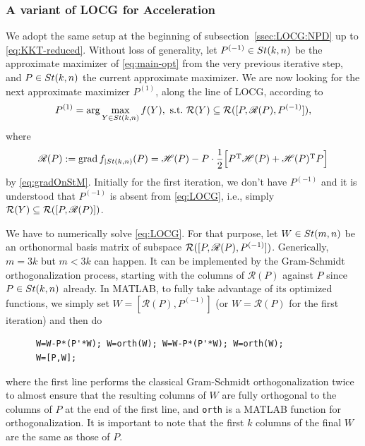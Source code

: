 \documentclass[11pt]{article}
\def\scrH{\mathscr{H}}
\def\scrR{\mathscr{R}}
\def\cR{{\cal R}}
\newcommand\STM[2]{{\rm St}(#1,#2)}
\DeclareMathOperator{\grad}{grad}
\DeclareMathOperator{\T}{T}
\def\scrR{\mathscr{R}}
\theoremstyle{definition}
\numberwithin{equation}{section}
\begin{document}
\subsubsection*{A variant of LOCG for Acceleration}
We adopt the same setup at the beginning of subsection~\ref{ssec:LOCG:NPD} up to \eqref{eq:KKT-reduced}.
\iffalse
Without loss of generality, let $P^{(-1)}\in\STM{k}{n}$ be the approximate maximizer of \eqref{eq:main-opt}
from the very previous iterative step, and $P\in\STM{k}{n}$ the current approximate maximizer.
We are now looking for the next approximate maximizer
$P^{(1)}$, along the line of LOCG, according to
\begin{equation}\label{eq:LOCG}
P^{(1)}=\arg\max_{Y\in\STM{k}{n}}f(Y),\,\,\mbox{s.t.}\,\, \cR(Y)\subseteq\cR([P,\scrR(P),P^{(-1)}]),
\end{equation}
where
\begin{equation}\label{eq:R(P)}
\scrR(P):=\grad f_{|{\STM{k}{n}}}(P)=\scrH(P)-P\cdot\frac 12\Big[P^{\T}\scrH(P)+\scrH(P)^{\T}P\Big]
\end{equation}
by \eqref{eq:gradOnStM}.
Initially for the first iteration, we don't have $P^{(-1)}$ and
it is understood that $P^{(-1)}$ is absent from \eqref{eq:LOCG}, i.e.,
simply $\cR(Y)\subseteq\cR([P,\scrR(P)])$.

We have to numerically solve \eqref{eq:LOCG}. For that purpose, let $W\in\STM{m}{n}$ be an orthonormal basis matrix of subspace
$\cR([P,\scrR(P),P^{(-1)}])$. Generically, $m=3k$ but $m<3k$ can happen.
It can be implemented by the Gram-Schmidt orthogonalization process, starting with the columns of $\scrR(P)$ against $P$ since
$P\in\STM{k}{n}$ already. In MATLAB, to fully take advantage of its optimized functions, we simply set
$W=[\scrR(P),P^{(-1)}]$ (or $W=\scrR(P)$ for the first iteration) and then  do
\begin{verbatim}
      W=W-P*(P'*W); W=orth(W); W=W-P*(P'*W); W=orth(W);
      W=[P,W];
\end{verbatim}
where the first line  performs the classical Gram-Schmidt orthogonalization twice to almost ensure that
the resulting  columns of $W$ are fully orthogonal to the columns of $P$ at the end of the first line,
and {\tt orth} is a MATLAB function for orthogonalization. It is important to note that the first $k$ columns of
the final $W$ are the same as those of $P$.
\end{document}
